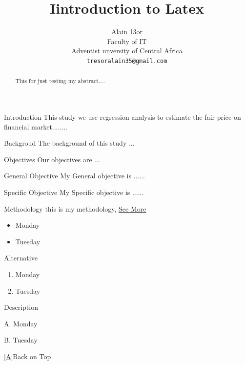 \documentclass[10pt]{article}
\begin{document}
\title{Iintroduction to Latex}
\maketitle
\author{Alain 13or\\
Faculty of IT\\
Adventist unversity of Central Africa\\
\texttt{tresoralain35@gmail.com}
}




\begin{abstract}
This  for just testing my abstract....
\end{abstract}

\tableofcontents

\begin{section}{Introduction}
This study we use regression analysis to estimate the fair price on financial market........\label{A}

\begin{subsection}{Backgroud}
The background of this study ...
\end{subsection}

\begin{subsection}{Objectives}
Our objectives are ...
\begin{subsubsection}{General Objective}
My General objective is ......
\end{subsubsection}

\begin{subsubsection}{Specific Objective}
My Specific objective is ......
\end{subsubsection}

\end{subsection}

\end{section}

\newpage
\begin{section}{Methodology}
this is my methodology, \href{https://www.khanacademy.org/math/statistics-probability}{See More}

\begin{itemize}
\item Monday
\item Tuesday
\end{itemize}
Alternative
\begin{enumerate}
\item Monday
\item Tuesday
\end{enumerate}
Description
\begin{description}
\item{A.} Monday
\item {B.} Tuesday

\end{description}

 \ref{A}{Back on Top}
\end{section}
\end{document}
